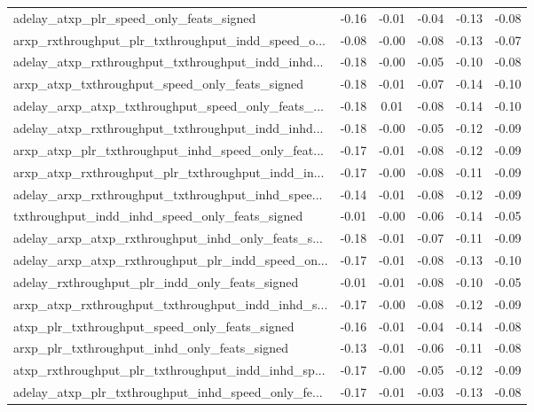 \begin{tabular}{|l|*{4}{c}|r|}
adelay\_atxp\_plr\_speed\_only\_feats\_signed            & -0.16 & -0.01 &   -0.04 &      -0.13 & -0.08 \\
arxp\_rxthroughput\_plr\_txthroughput\_indd\_speed\_o... & -0.08 & -0.00 &   -0.08 &      -0.13 & -0.07 \\
adelay\_atxp\_rxthroughput\_txthroughput\_indd\_inhd... & -0.18 & -0.00 &   -0.05 &      -0.10 & -0.08 \\
arxp\_atxp\_txthroughput\_speed\_only\_feats\_signed     & -0.18 & -0.01 &   -0.07 &      -0.14 & -0.10 \\
adelay\_arxp\_atxp\_txthroughput\_speed\_only\_feats\_... & -0.18 &  0.01 &   -0.08 &      -0.14 & -0.10 \\
adelay\_atxp\_rxthroughput\_txthroughput\_indd\_inhd... & -0.18 & -0.00 &   -0.05 &      -0.12 & -0.09 \\
arxp\_atxp\_plr\_txthroughput\_inhd\_speed\_only\_feat... & -0.17 & -0.01 &   -0.08 &      -0.12 & -0.09 \\
arxp\_atxp\_rxthroughput\_plr\_txthroughput\_indd\_in... & -0.17 & -0.00 &   -0.08 &      -0.11 & -0.09 \\
adelay\_arxp\_rxthroughput\_txthroughput\_inhd\_spee... & -0.14 & -0.01 &   -0.08 &      -0.12 & -0.09 \\
txthroughput\_indd\_inhd\_speed\_only\_feats\_signed     & -0.01 & -0.00 &   -0.06 &      -0.14 & -0.05 \\
adelay\_arxp\_atxp\_rxthroughput\_inhd\_only\_feats\_s... & -0.18 & -0.01 &   -0.07 &      -0.11 & -0.09 \\
adelay\_arxp\_atxp\_rxthroughput\_plr\_indd\_speed\_on... & -0.17 & -0.01 &   -0.08 &      -0.13 & -0.10 \\
adelay\_rxthroughput\_plr\_indd\_only\_feats\_signed     & -0.01 & -0.01 &   -0.08 &      -0.10 & -0.05 \\
arxp\_atxp\_rxthroughput\_txthroughput\_indd\_inhd\_s... & -0.17 & -0.00 &   -0.08 &      -0.12 & -0.09 \\
atxp\_plr\_txthroughput\_speed\_only\_feats\_signed      & -0.16 & -0.01 &   -0.04 &      -0.14 & -0.08 \\
arxp\_plr\_txthroughput\_inhd\_only\_feats\_signed       & -0.13 & -0.01 &   -0.06 &      -0.11 & -0.08 \\
atxp\_rxthroughput\_plr\_txthroughput\_indd\_inhd\_sp... & -0.17 & -0.00 &   -0.05 &      -0.12 & -0.09 \\
adelay\_atxp\_plr\_txthroughput\_inhd\_speed\_only\_fe... & -0.17 & -0.01 &   -0.03 &      -0.13 & -0.08 \\

\end{tabular}
